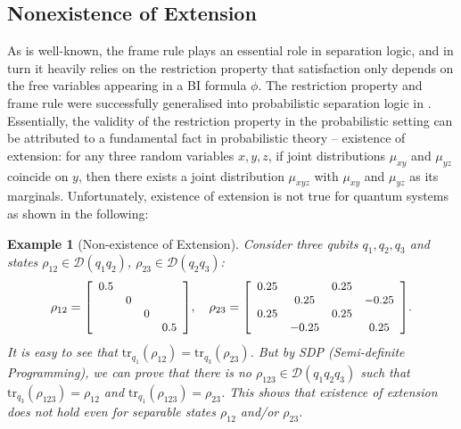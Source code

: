 \documentclass[conference,compsoc, 10pt]{IEEEtran}
\newtheorem{example}{Example}[section]
\newcommand {\cD } {{\mathcal{D}}}
\newcommand {\tr } {{\mathrm{tr}}}
\newcommand {\prog } {{\mathbf{C}}}
\newcommand {\sem}[1] {\llbracket#1\rrbracket}
\begin{document}
\begin{appendices}
		\subsection{Nonexistence of Extension}
		
		As is well-known, the frame rule plays an essential role in separation logic, and in turn it heavily relies on the restriction property that satisfaction only depends on the free variables appearing in a BI formula $\phi$. The restriction property and frame rule were successfully generalised into probabilistic separation logic in \cite{BHL19}. Essentially, the validity of the restriction property in the probabilistic setting can be attributed to a fundamental fact in probabilistic theory -- existence of extension: for any three random variables $x,y,z$, if joint distributions $\mu_{xy}$ and $\mu_{yz}$ coincide on $y$, then there exists a joint distribution $\mu_{xyz}$ with $\mu_{xy}$ and $\mu_{yz}$ as its marginals. Unfortunately, existence of extension is not true for quantum systems as shown in the following:
		
		\begin{example}[Non-existence of Extension]
			\label{prop noexist extension}
			Consider three qubits $q_1,q_2,q_3$ and states $\rho_{12}\in\cD(q_1q_2)$, $\rho_{23}\in\cD(q_2q_3)$:
			$$\rho_{12} = {\small\left[\begin{array}{cccc}0.5 & & & \\ & 0 & & \\ & & 0 & \\ & & & 0.5\end{array}\right]},\quad
			\rho_{23} = {\small\left[\begin{array}{cccc}0.25 & & 0.25 & \\ & 0.25 & & -0.25\\ 0.25 & & 0.25 & \\ & -0.25 & & 0.25\end{array}\right]}.
			$$
			It is easy to see that $\tr_{q_1}(\rho_{12}) = \tr_{q_3}(\rho_{23})$. But by SDP (Semi-definite Programming), we can prove that there is no  $\rho_{123}\in\cD(q_1q_2q_3)$ such that $\tr_{q_3}(\rho_{123}) = \rho_{12}$ and $\tr_{q_1}(\rho_{123}) = \rho_{23}$. This shows that existence of extension does not hold even for separable states $\rho_{12}$ and/or $\rho_{23}$.
		\end{example}
		
		

\end{appendices}
\end{document}
